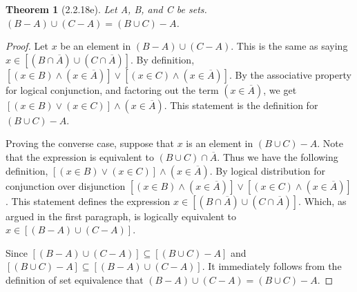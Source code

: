 \documentclass[a4paper, 12pt]{article}
\theoremstyle{plain}
\newtheorem*{theorem*}{Theorem}
\begin{document}
	
	\begin{theorem*}[2.2.18e]
		Let A, B, and C be sets. $(B - A) \cup (C - A) = (B \cup C) - A$.
	\end{theorem*}
	
	\begin{proof}
		Let $x$ be an element in $(B - A) \cup (C - A)$. This is the same as saying 
		$x \in [(B \cap \overline{A}) \cup (C \cap \overline{A})]$. By definition, \newline 
		$[(x \in B) \land (x \in \overline{A})] \lor [(x \in C) \land (x \in \overline{A})]$. By 
		the associative property for logical conjunction, and factoring out the term 
		$(x \in \overline{A})$, we get \newline 
		$[(x \in B) \lor (x \in C)] \land (x \in \overline{A})$. This statement is the definition 
		for \newline $(B \cup C) - A$.
		
		Proving the converse case, suppose that $x$ is an element in $(B \cup C) - A$. Note that 
		the expression is equivalent to $(B \cup C) \cap \overline{A}$. Thus we have the following 
		definition, $[(x \in B) \lor (x \in C)] \land (x \in \overline{A})$. By logical distribution 
		for conjunction over disjunction 
		$[(x \in B) \land (x \in \overline{A})] \lor [(x \in C) \land (x \in \overline{A})]$. This 
		statement defines the expression $x \in [(B \cap \overline{A}) \cup (C \cap \overline{A})]$. 
		Which, as argued in the first paragraph, is logically equivalent to 
		$x \in [(B - A) \cup (C - A)]$.
		
		Since $[(B - A) \cup (C - A)] \subseteq [(B \cup C) - A]$ and \newline 
		$[(B \cup C) - A] \subseteq [(B - A) \cup (C - A)]$. It immediately follows from the definition 
		of set equivalence that $(B - A) \cup (C - A) = (B \cup C) - A$.
	\end{proof}
\end{document}
